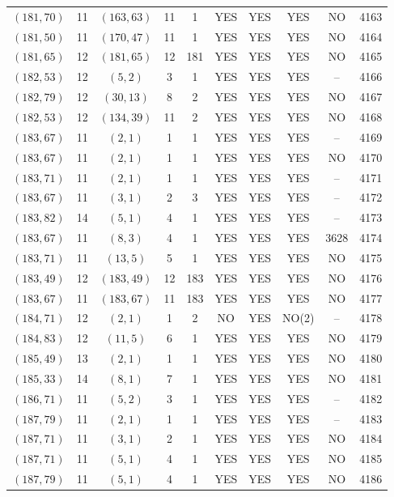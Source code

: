 \begin{longtable}{|c|c|c|c|c|c|c|c|c|c|}
$(181, 70)$ & 11 & $(163, 63)$ & 11 & 1 & YES & YES & YES & NO & 4163\\
$(181, 50)$ & 11 & $(170, 47)$ & 11 & 1 & YES & YES & YES & NO & 4164\\
$(181, 65)$ & 12 & $(181, 65)$ & 12 & 181 & YES & YES & YES & NO & 4165\\
$(182, 53)$ & 12 & $(5, 2)$ & 3 & 1 & YES & YES & YES & -- & 4166\\
$(182, 79)$ & 12 & $(30, 13)$ & 8 & 2 & YES & YES & YES & NO & 4167\\
$(182, 53)$ & 12 & $(134, 39)$ & 11 & 2 & YES & YES & YES & NO & 4168\\
$(183, 67)$ & 11 & $(2, 1)$ & 1 & 1 & YES & YES & YES & -- & 4169\\
$(183, 67)$ & 11 & $(2, 1)$ & 1 & 1 & YES & YES & YES & NO & 4170\\
$(183, 71)$ & 11 & $(2, 1)$ & 1 & 1 & YES & YES & YES & -- & 4171\\
$(183, 67)$ & 11 & $(3, 1)$ & 2 & 3 & YES & YES & YES & -- & 4172\\
$(183, 82)$ & 14 & $(5, 1)$ & 4 & 1 & YES & YES & YES & -- & 4173\\
$(183, 67)$ & 11 & $(8, 3)$ & 4 & 1 & YES & YES & YES & 3628 & 4174\\
$(183, 71)$ & 11 & $(13, 5)$ & 5 & 1 & YES & YES & YES & NO & 4175\\
$(183, 49)$ & 12 & $(183, 49)$ & 12 & 183 & YES & YES & YES & NO & 4176\\
$(183, 67)$ & 11 & $(183, 67)$ & 11 & 183 & YES & YES & YES & NO & 4177\\
$(184, 71)$ & 12 & $(2, 1)$ & 1 & 2 & NO & YES & NO(2) & -- & 4178\\
$(184, 83)$ & 12 & $(11, 5)$ & 6 & 1 & YES & YES & YES & NO & 4179\\
$(185, 49)$ & 13 & $(2, 1)$ & 1 & 1 & YES & YES & YES & NO & 4180\\
$(185, 33)$ & 14 & $(8, 1)$ & 7 & 1 & YES & YES & YES & NO & 4181\\
$(186, 71)$ & 11 & $(5, 2)$ & 3 & 1 & YES & YES & YES & -- & 4182\\
$(187, 79)$ & 11 & $(2, 1)$ & 1 & 1 & YES & YES & YES & -- & 4183\\
$(187, 71)$ & 11 & $(3, 1)$ & 2 & 1 & YES & YES & YES & NO & 4184\\
$(187, 71)$ & 11 & $(5, 1)$ & 4 & 1 & YES & YES & YES & NO & 4185\\
$(187, 79)$ & 11 & $(5, 1)$ & 4 & 1 & YES & YES & YES & NO & 4186\\

\end{longtable}
